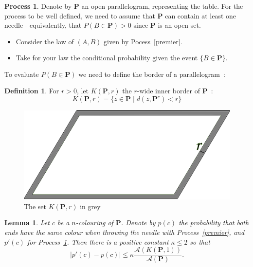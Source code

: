\documentclass[a4paper,11pt]{article}
\newtheorem{lemma}{Lemma}
\theoremstyle{definition}
\newtheorem{definition}{Definition}
\newtheorem{process}{Process}
\theoremstyle{remark}
\begin{document}
\begin{process} \label{encore}
Denote by $\mathbf{P}$ an open parallelogram, representing the table. For the 
process to be well defined, we need to assume that $\mathbf{P}$ can contain at
least one needle - equivalently, that $P(B \in \mathbf{P}) > 0$ since $\mathbf{P}$ 
is an open set.
\begin{itemize}
\item Consider the law of $(A,B)$ given by Pocess~\ref{premier}.
\item Take for your law the conditional probability given the event 
$\{B \in \mathbf{P} \}$.
\end{itemize}
\end{process}

To evaluate $P(B \in \mathbf{P})$ we need to define the border of a parallelogram~:
\begin{definition}
For $r>0$, let $K(\mathbf{P},r)$ the $r$-wide inner border of $\mathbf{P}$~:
\[K(\mathbf{P},r) = \{ z \in \mathbf{P} \mid d(z,\mathbf{P}^c) < r\} \] 
\end{definition}

\begin{figure}[h]
\center
\includegraphics[scale=0.5]{tablefinie.png}
\caption{\label{tablefinie} The set $K(\mathbf{P},r)$ in grey}
\end{figure}

\begin{lemma}
Let $c$ be a $n$-colouring of $\mathbf{P}$. Denote by $p(c)$ the probability 
that both ends have the same colour when throwing 
the needle with Process~\ref{premier}, and $p'(c)$ for Process~\ref{encore}. Then 
there is a positive constant $\kappa \leq 2$ so that 
$$ | p'(c) - p(c)| \leq \kappa \frac{\mathcal{A}(K(\mathbf{P},1))}{\mathcal{A}(\mathbf{P})}.$$
\end{lemma}
\end{document}
